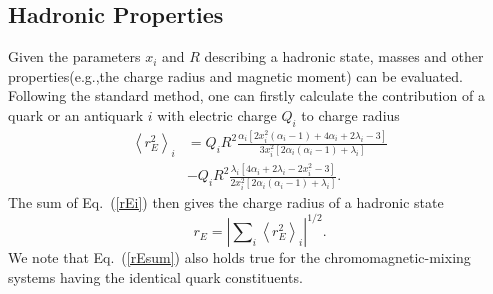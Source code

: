 \documentclass[12pt,onecolumn,floatfix,nofootinbib]{revtex4}
\begin{document}
\subsection{Hadronic Properties}

Given the parameters $x_{i}$ and $R$ describing a hadronic state, masses and
other properties(e.g.,the charge radius and magnetic moment) can be
evaluated. Following the standard method, one can firstly calculate the
contribution of a quark or an antiquark $i$ with electric charge $Q_{i}$ to
charge radius \cite{DeGrand:1975cf}
\begin{equation}
\begin{aligned} {\left\langle r_{E}^{2} \right\rangle}_{i}&= Q_{i}R^{2}
\frac{\alpha_{i}
\left[2x_{i}^{2}\left(\alpha_{i}-1\right)+4\alpha_{i}+2\lambda_{i}-3\right]}
{3x_{i}^{2} \left[2\alpha_{i}\left(\alpha_{i}-1\right)+\lambda_{i}\right]}
\\ &-Q_{i}R^{2} \frac{\lambda_{i}
\left[4\alpha_{i}+2\lambda_{i}-2x_{i}^{2}-3\right]} {2x_{i}^{2}
\left[2\alpha_{i}\left(\alpha_{i}-1\right)+\lambda_{i}\right]}. \end{aligned}
\label{rEi}
\end{equation}%
The sum of Eq.~(\ref{rEi}) then gives the charge radius of a hadronic state
\cite{Chodos:1974pn}
\begin{equation}
r_{E}={\left\vert \sum\nolimits_{i}{\left\langle r_{E}^{2}\right\rangle }%
_{i}\right\vert }^{1/2}.  \label{rEsum}
\end{equation}%
We note that Eq.~(\ref{rEsum}) also holds true for the chromomagnetic-mixing
systems having the identical quark constituents.
\end{document}
